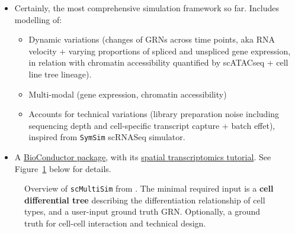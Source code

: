 \documentclass[
  letterpaper,
]{book}
\providecommand{\tightlist}{%
  \setlength{\itemsep}{0pt}\setlength{\parskip}{0pt}}\usepackage{longtable,booktabs,array}
\begin{document}
\begin{itemize}
  \begin{itemize}
  \item
    Certainly, the most comprehensive simulation framework so far.
    Includes modelling of:

    \begin{itemize}
    \tightlist
    \item
      Dynamic variations (changes of GRNs across time points, aka RNA
      velocity + varying proportions of spliced and unspliced gene
      expression, in relation with chromatin accessibility quantified by
      scATACseq + cell line tree lineage).
    \item
      Multi-modal (gene expression, chromatin accessibility)
    \item
      Accounts for technical variations (library preparation noise
      including sequencing depth and cell-specific transcript capture +
      batch effet), inspired from \texttt{SymSim} \autocite{zhang2019nc}
      scRNASeq simulator.
    \end{itemize}
  \item
    A
    \href{https://www.bioconductor.org/packages/release/bioc/html/scMultiSim.html}{BioConductor
    package}, with its
    \href{https://zhanglabgt.github.io/scMultiSim/articles/spatialCCI.html}{spatial
    transcriptomics tutorial}. See Figure~\ref{fig-scMultisim} below for
    details.
  \end{itemize}
\end{itemize}

\begin{figure}


\caption{\label{fig-scMultisim}Overview of \texttt{scMultiSim} from
\href{https://pmc.ncbi.nlm.nih.gov/articles/PMC10055660/figure/F1}{\textcite{li2023rs}}.
The minimal required input is a \textbf{cell differential tree}
describing the differentiation relationship of cell types, and a
user-input ground truth GRN. Optionally, a ground truth for cell-cell
interaction and technical design.}

\end{figure}%
\end{document}
